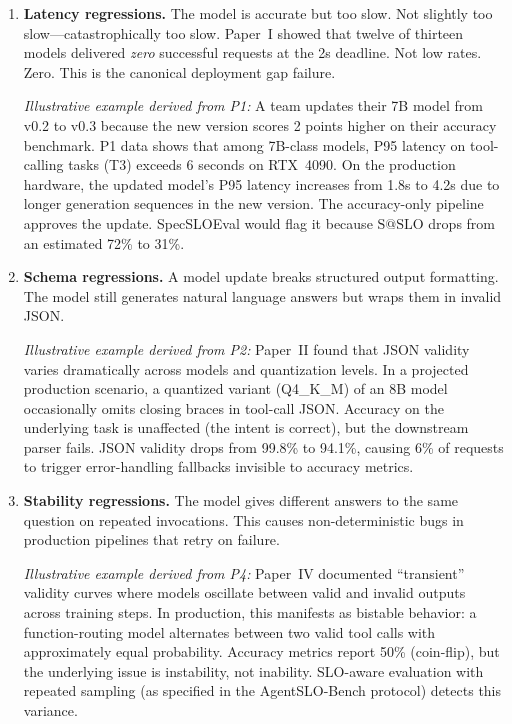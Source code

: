 \documentclass[11pt]{article}
\makeatletter
\newcommand{\sslo}{\ensuremath{\mathrm{S@SLO}}}
\makeatother
\begin{document}
\begin{enumerate}[leftmargin=16pt]
    \item \textbf{Latency regressions.} The model is accurate but too slow. Not slightly too slow---catastrophically too slow. Paper~I showed that twelve of thirteen models delivered \emph{zero} successful requests at the 2s deadline. Not low rates. Zero. This is the canonical deployment gap failure.

    \textit{Illustrative example derived from P1:} A team updates their 7B model from v0.2 to v0.3 because the new version scores 2 points higher on their accuracy benchmark. P1 data shows that among 7B-class models, P95 latency on tool-calling tasks (T3) exceeds 6 seconds on RTX~4090. On the production hardware, the updated model's P95 latency increases from 1.8s to 4.2s due to longer generation sequences in the new version. The accuracy-only pipeline approves the update. SpecSLOEval would flag it because $\sslo{}$ drops from an estimated 72\% to 31\%.

    \item \textbf{Schema regressions.} A model update breaks structured output formatting. The model still generates natural language answers but wraps them in invalid JSON.

    \textit{Illustrative example derived from P2:} Paper~II found that JSON validity varies dramatically across models and quantization levels. In a projected production scenario, a quantized variant (Q4\_K\_M) of an 8B model occasionally omits closing braces in tool-call JSON. Accuracy on the underlying task is unaffected (the intent is correct), but the downstream parser fails. JSON validity drops from 99.8\% to 94.1\%, causing 6\% of requests to trigger error-handling fallbacks invisible to accuracy metrics.

    \item \textbf{Stability regressions.} The model gives different answers to the same question on repeated invocations. This causes non-deterministic bugs in production pipelines that retry on failure.

    \textit{Illustrative example derived from P4:} Paper~IV documented ``transient'' validity curves where models oscillate between valid and invalid outputs across training steps. In production, this manifests as bistable behavior: a function-routing model alternates between two valid tool calls with approximately equal probability. Accuracy metrics report 50\% (coin-flip), but the underlying issue is instability, not inability. SLO-aware evaluation with repeated sampling (as specified in the AgentSLO-Bench protocol) detects this variance.


\end{enumerate}
\end{document}
